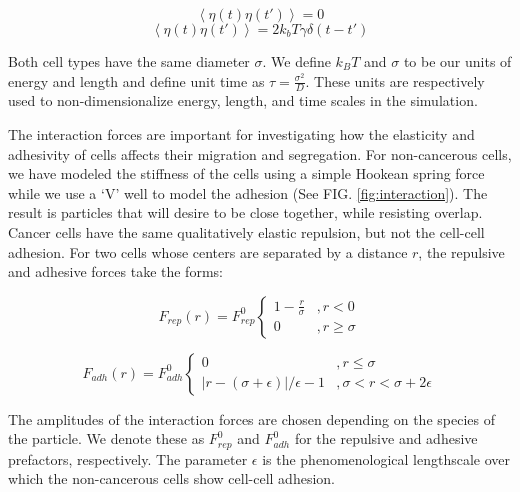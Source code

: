 \documentclass[aps,prb,twocolumn,groupedaddress,nofootinbib,floatfix]{revtex4}
\begin{document}
\begin{equation}
\left\langle \eta(t)\eta(t')\right\rangle = 0 
\end{equation}
\begin{equation}
\left\langle \eta(t)\eta(t')\right\rangle = 2k_bT\gamma
\delta(t-t')
\end{equation}

Both cell types have the same diameter  $\sigma$.
We define $k_BT$ and $\sigma$ to be our units of energy and length and define 
unit time as $\tau = \frac{\sigma^2}{D}$. These units are respectively used to non-dimensionalize 
energy, length, and time scales in the simulation. 


The interaction forces are important for investigating how the elasticity and adhesivity of cells affects their migration and segregation. For non-cancerous cells, 
we have modeled the stiffness of the cells using a simple Hookean spring force while we use a `V' well to model the adhesion (See FIG. \ref{fig:interaction}). 
The result is particles that will desire to be close together, while resisting overlap. Cancer cells have the same qualitatively elastic repulsion, but not the cell-cell 
adhesion. For two cells whose centers are separated by a distance $r$, the repulsive and adhesive forces take the forms:

\begin{equation}
  F_{rep}(r) = F^0_{rep} \left\{ 
    \begin{array}{lr}
      1-\frac{r}{\sigma} &, r < 0\\
      0 &, r \ge \sigma
    \end{array}
  \right.
  \label{eq:frep}
\end{equation}

\begin{equation}
  F_{adh}(r) =F^0_{adh} \left\{
    \begin{array}{lr}
      0 &, r \le \sigma \\
      |r - (\sigma+\epsilon)|/\epsilon-1 &, \sigma < r < \sigma+2\epsilon
    \end{array}
  \right.
  \label{eq:fadh}
\end{equation}

The amplitudes of the interaction forces are chosen depending on the species of the particle. We denote these as $F^0_{rep}$ and $F^0_{adh}$ for the repulsive and adhesive prefactors, respectively.
The parameter $\epsilon$ is the phenomenological lengthscale over which the non-cancerous cells show cell-cell adhesion. 
\end{document}
